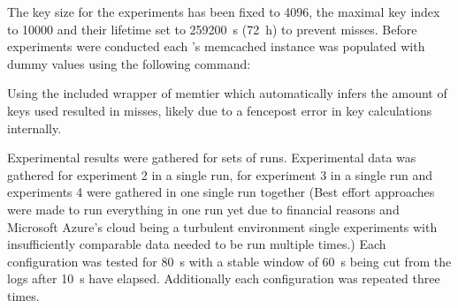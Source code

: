         The key size for the experiments has been fixed to \SI{4096}{\byte}, the maximal key index to 10000 and their
        lifetime set to \SI{259200}{\second} (\SI{72}{\hour}) to prevent misses. Before experiments were conducted
        each \srv{}'s memcached instance was populated with dummy values using the following command:

        Using the included wrapper of memtier which automatically infers the amount of keys used resulted in misses,
        likely due to a fencepost error in key calculations internally.

        Experimental results were gathered for sets of runs. Experimental data was gathered for experiment 2 in a
        single run, for experiment 3 in a single run and experiments 4 were gathered in one single run
        together (Best effort approaches were made to run everything in one run yet due to financial reasons and
        Microsoft Azure's cloud being a turbulent environment single experiments with insufficiently comparable data
        needed to be run multiple times.) Each configuration was tested for \SI{80}{\second} with a stable window of
        \SI{60}{\second} being cut from the logs after \SI{10}{\second} have elapsed. Additionally each configuration was
        repeated three times.
